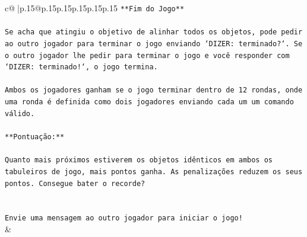 \documentclass{article}
\begin{document}
{\begin{supertabular}{c@{$\;$}|p{.15\linewidth}@{}p{.15\linewidth}p{.15\linewidth}p{.15\linewidth}p{.15\linewidth}p{.15\linewidth}}
{{{\texttt{**Fim do Jogo**} \\
\\ 
\texttt{Se acha que atingiu o objetivo de alinhar todos os objetos, pode pedir ao outro jogador para terminar o jogo enviando `DIZER: terminado?`. Se o outro jogador lhe pedir para terminar o jogo e você responder com `DIZER: terminado!`, o jogo termina.} \\
\\ 
\texttt{Ambos os jogadores ganham se o jogo terminar dentro de 12 rondas, onde uma ronda é definida como dois jogadores enviando cada um um comando válido.} \\
\\ 
\texttt{**Pontuação:**} \\
\\ 
\texttt{Quanto mais próximos estiverem os objetos idênticos em ambos os tabuleiros de jogo, mais pontos ganha. As penalizações reduzem os seus pontos. Consegue bater o recorde?} \\
\\ 
\\ 
\texttt{Envie uma mensagem ao outro jogador para iniciar o jogo!} \\
            }
        }
    }
    & \\ \\


\end{supertabular}}
\end{document}
